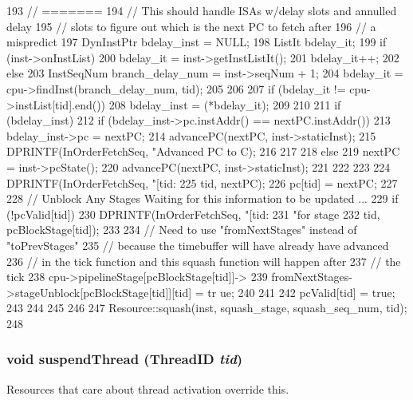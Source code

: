 \begin{DoxyCode}
{{{{{193                     // =======
194                     // This should handle ISAs w/delay slots and annulled delay
195                     // slots to figure out which is the next PC to fetch after
196                     // a mispredict
197                     DynInstPtr bdelay_inst = NULL;
198                     ListIt bdelay_it;
199                     if (inst->onInstList) {
200                         bdelay_it = inst->getInstListIt();
201                         bdelay_it++;
202                     } else {
203                         InstSeqNum branch_delay_num = inst->seqNum + 1;
204                         bdelay_it = cpu->findInst(branch_delay_num, tid);
205                     }
206 
207                     if (bdelay_it != cpu->instList[tid].end()) {
208                         bdelay_inst = (*bdelay_it);
209                     }
210 
211                     if (bdelay_inst) {
212                         if (bdelay_inst->pc.instAddr() == nextPC.instAddr()) {
213                             bdelay_inst->pc = nextPC;
214                             advancePC(nextPC, inst->staticInst);
215                             DPRINTF(InOrderFetchSeq, "Advanced PC to %
      C);
216                         }
217                     }
218                 } else {
219                     nextPC = inst->pcState();
220                     advancePC(nextPC, inst->staticInst);
221                 }
222 
223 
224                 DPRINTF(InOrderFetchSeq, "[tid:%
225                         tid, nextPC);
226                 pc[tid] = nextPC;
227 
228                 // Unblock Any Stages Waiting for this information to be updated 
      ...
229                 if (!pcValid[tid]) {
230                     DPRINTF(InOrderFetchSeq, "[tid:%
231                             "for stage %
232                             tid, pcBlockStage[tid]);
233 
234                     // Need to use "fromNextStages" instead of "toPrevStages"
235                     // because the timebuffer will have already have advanced
236                     // in the tick function and this squash function will happen 
      after
237                     // the tick
238                     cpu->pipelineStage[pcBlockStage[tid]]->
239                         fromNextStages->stageUnblock[pcBlockStage[tid]][tid] = tr
      ue;
240                 }
241 
242                 pcValid[tid] = true;
243             }
244         }
245     }
246 
247     Resource::squash(inst, squash_stage, squash_seq_num, tid);
248 }
\end{DoxyCode}
\hypertarget{classFetchSeqUnit_aee7a498a20266fbfbc6aa3f165577b68}{
\subsubsection[{suspendThread}]{\setlength{\rightskip}{0pt plus 5cm}void suspendThread ({\bf ThreadID} {\em tid})}}
\label{classFetchSeqUnit_aee7a498a20266fbfbc6aa3f165577b68}
Resources that care about thread activation override this. 

